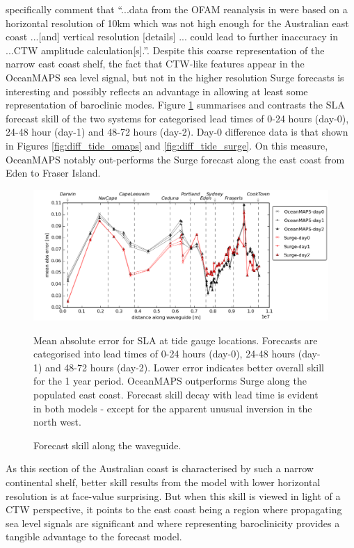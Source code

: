 \citet[p.312]{Liao:2018jd} specifically comment that ``...data from the OFAM reanalysis in \citet{Woodham:2013cl} were based on a horizontal resolution of 10km which was not high enough for the Australian east coast ...[and] vertical resolution [details] ... could lead to further inaccuracy in ...CTW amplitude calculation[s].''.
Despite this coarse representation of the narrow east coast shelf, the fact that CTW-like features appear in the OceanMAPS sea level signal, but not in the higher resolution Surge forecasts is interesting and possibly reflects an advantage in allowing at least some representation of baroclinic modes.   
Figure \ref{fig:skill_mebs} summarises and contrasts the SLA forecast skill of the two systems for categorised lead times of 0-24 hours (day-0), 24-48 hour (day-1) and 48-72 hours (day-2).  Day-0 difference data is that shown in Figures \ref{fig:diff_tide_omaps} and \ref{fig:diff_tide_surge}.
On this measure, OceanMAPS notably out-performs the Surge forecast along the east coast from Eden to Fraser Island.
\begin{figure}[!hbt] \centering
    \includegraphics[width=\figwidthFull]{figures/plots/plot_skill_path_mebs.png}
    \caption{Forecast skill along the waveguide.}
    {Mean absolute error for SLA at tide gauge locations. Forecasts are categorised into lead times of 0-24 hours (day-0), 24-48 hours (day-1) and 48-72 hours (day-2). Lower error indicates better overall skill for the 1 year period. OceanMAPS outperforms Surge along the populated east coast. Forecast skill decay with lead time is evident in both models - except for the apparent unusual inversion in the north west.}
    \label{fig:skill_mebs}
\end{figure}
As this section of the Australian coast is characterised by such a narrow continental shelf, better skill results from the model with lower horizontal resolution is at face-value surprising.  But when this skill is viewed in light of a CTW perspective, it points to the east coast being a region where  propagating sea level signals are significant and where representing baroclinicity provides a tangible advantage to the forecast model.


